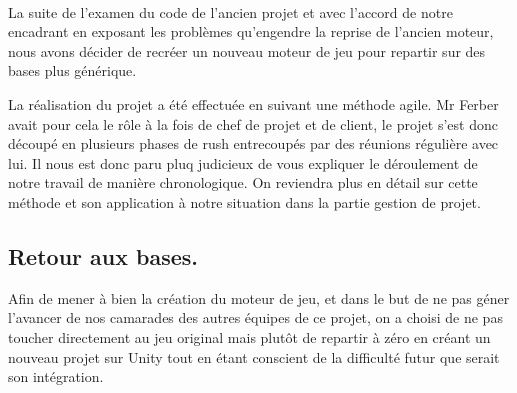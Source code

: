 \documentclass{report}
\begin{document}
\paragraph{} La suite de l'examen du code de l'ancien projet et avec l'accord de notre encadrant en exposant les problèmes qu'engendre la reprise de l'ancien moteur, nous avons décider de recréer un nouveau moteur de jeu pour repartir sur des bases plus générique.


La réalisation du projet a été effectuée en suivant une méthode agile. Mr Ferber avait pour cela le rôle à la fois de chef de projet et de client, le projet s'est donc découpé en plusieurs phases de rush entrecoupés par des réunions régulière avec lui. Il nous est donc paru pluq judicieux de vous expliquer le déroulement de notre travail de manière chronologique. On reviendra plus en détail sur cette méthode et son application à notre situation dans la partie gestion de projet. 


\subsection{Retour aux bases.}

Afin de mener à bien la création du moteur de jeu, et dans le but de ne pas géner l'avancer de nos camarades des autres équipes de ce projet, on a choisi de ne pas toucher directement au jeu original mais plutôt de repartir à zéro en créant un nouveau projet sur Unity tout en étant conscient de la difficulté futur que serait son intégration.
\end{document}
